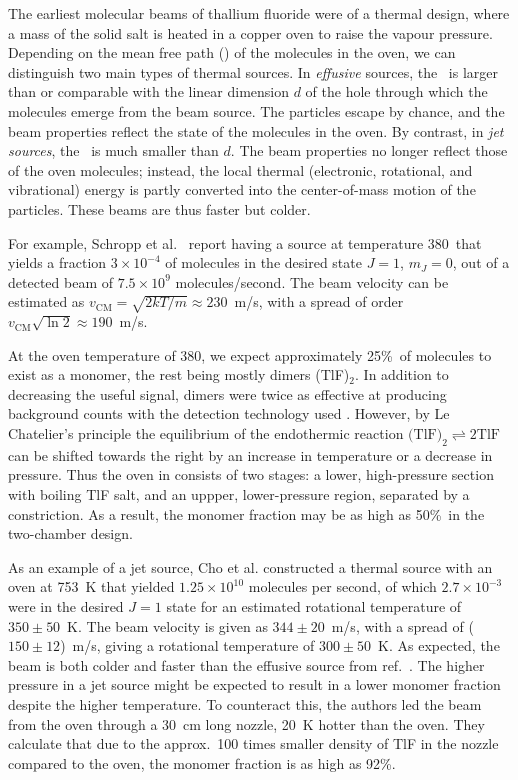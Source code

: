 The earliest molecular beams of thallium fluoride were of a thermal design,
where a mass of the solid salt is heated in a copper oven to raise the vapour
pressure. Depending on the mean free path (\mfp) of the molecules in the oven,
we can distinguish two main types of thermal sources. In \emph{effusive}
sources, the \mfp\ is larger than or comparable with the linear dimension $d$ of
the hole through which the molecules emerge from the beam source. The particles
escape by chance, and the beam properties reflect the state of the molecules in
the oven. By contrast, in \emph{jet sources}, the \mfp\ is much smaller than
$d$. The beam properties no longer reflect those of the oven molecules; instead,
the local thermal (electronic, rotational, and vibrational) energy is partly
converted into the center-of-mass motion of the particles. These beams are thus
faster but colder.

For example, Schropp et al.\ \cite{schropp1987new,schropp1988thesis} report
having a source at temperature 380\degC\ that yields a fraction $3\times10^{-4}$
of molecules in the desired state $J=1$, $m_J=0$, out of a detected beam of
$7.5\times10^9$ molecules/second. The beam velocity can be estimated as
$v_\text{CM}=\sqrt{2kT/m}\approx230$~m/s, with a spread of order
$v_\text{CM}\sqrt{\ln2}\approx190$~m/s.

At the oven temperature of 380\degC, we expect approximately 25\%\ of molecules
to exist as a monomer, the rest being mostly dimers (TlF)$_2$.
\cite{schropp1987new,schropp1988thesis} In addition to decreasing the useful
signal, dimers were twice as effective at producing background counts with the
detection technology used \cite{schropp1987new,schropp1988thesis}. However, by
Le Chatelier's principle the equilibrium of the endothermic reaction
$\text{(TlF)}_2\rightleftharpoons2\text{TlF}$ can be shifted towards the right
by an increase in temperature or a decrease in pressure. Thus the oven in
\cite{schropp1987new,schropp1988thesis} consists of two stages: a lower,
high-pressure section with boiling TlF salt, and an uppper, lower-pressure
region, separated by a constriction. As a result, the monomer fraction may be as
high as 50\%\ in the two-chamber design.

As an example of a jet source, Cho et al. \cite{cho1990thesis,cho1991search}
constructed a thermal source with an oven at 753~K that yielded
$1.25\times10^{10}$ molecules per second, of which $2.7\times 10^{-3}$ were in
the desired $J=1$ state for an estimated rotational temperature of $350\pm50$~K.
The beam velocity is given as $344\pm20$~m/s, with a spread of ($150\pm12$)~m/s,
giving a rotational temperature of $300\pm50$~K. As expected, the beam is both
colder and faster than the effusive source from ref.~\cite{schropp1987new}. The
higher pressure in a jet source might be expected to result in a lower monomer
fraction despite the higher temperature. To counteract this, the authors led the
beam from the oven through a 30~cm long nozzle, 20~K hotter than the oven. They
calculate that due to the approx.\ 100 times smaller density of TlF in the
nozzle compared to the oven, the monomer fraction is as high as 92\%.

